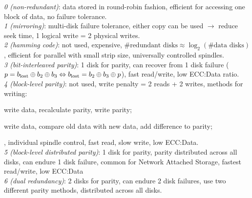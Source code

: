 \emph{0 (non-redundant)}: data stored in round-robin fashion,
efficient for accessing one block of data, no failure tolerance.\\
\emph{1 (mirroring)}: multi-disk failure tolerance,
either copy can be used $\rightarrow$ reduce seek time,
1 logical write = 2 physical writes.\\
\emph{2 (hamming code)}: not used, expensive,
$\text{\# redundant disks} \approx \log_2(\text{\# data disks})$,
efficient for parallel with small strip size, universally controlled spindles.\\
\emph{3 (bit-interleaved parity)}: 1 disk for parity, can recover from 1 disk failure
($p=b_\text{lost}\oplus b_2\oplus b_3 \Leftrightarrow b_\text{lost}=b_2\oplus b_3\oplus p$),
fast read/write, low ECC:Data ratio.\\
\emph{4 (block-level parity)}: not used, write penalty = 2 reads + 2 writes,
methods for writing: \begin{enuminline}
\item write data, recalculate parity, write parity;
\item write data, compare old data with new data, add difference to parity;
\end{enuminline}, individual spindle control, fast read, slow write, low ECC:Data.\\
\emph{5 (block-level distributed parity)}: 1 disk for parity, parity distributed across all disks,
can endure 1 disk failure, common for Network Attached Storage, fastest read/write, low ECC:Data\\
\emph{6 (dual redundancy)}: 2 disks for parity, can endure 2 disk failures,
use two different parity methods, distributed across all disks.